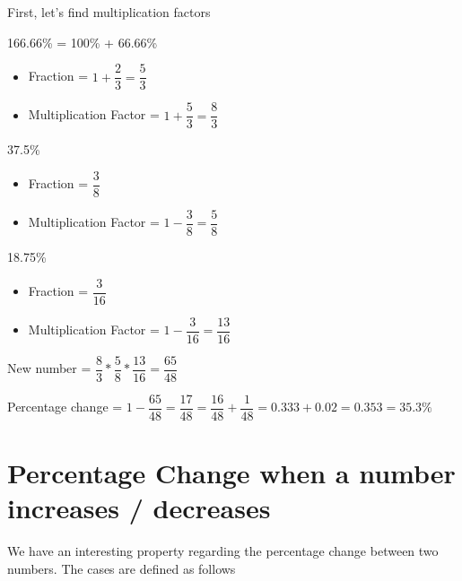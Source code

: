 First, let's find multiplication factors
\begin{multicols}{3}
    166.66\% = 100\% + 66.66\%
    
    \begin{itemize}
        \item Fraction = $1 + \dfrac{2}{3} = \dfrac{5}{3}$
        \item Multiplication Factor = $1 + \dfrac{5}{3} = \dfrac{8}{3}$
    \end{itemize}
    \columnbreak

    37.5\%
    \begin{itemize}
        \item Fraction = $\dfrac{3}{8}$
        \item Multiplication Factor = $1 - \dfrac{3}{8} = \dfrac{5}{8}$
    \end{itemize}
    \columnbreak

    18.75\%
    \begin{itemize}
        \item Fraction = $\dfrac{3}{16}$
        \item Multiplication Factor = $1 - \dfrac{3}{16} = \dfrac{13}{16}$
    \end{itemize}
    
\end{multicols}
\vspace{0.2cm}

New number = $\dfrac{8}{3} * \dfrac{5}{8} * \dfrac{13}{16} = \dfrac{65}{48}$
\vspace{0.2cm}

Percentage change = $1 - \dfrac{65}{48} = \dfrac{17}{48} = \dfrac{16}{48} + \dfrac{1}{48} = 0.333 + 0.02 = 0.353 = 35.3\%$
\newpage





















\section{Percentage Change when a number increases / decreases}
We have an interesting property regarding the percentage change between two numbers. The cases are defined as follows

